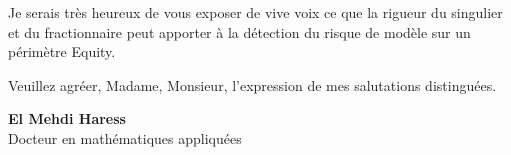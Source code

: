 \documentclass[10pt,a4paper]{article}
\begin{document}
Je serais très heureux de vous exposer de vive voix ce que la rigueur du singulier et du fractionnaire peut
apporter à la détection du risque de modèle sur un périmètre Equity.

Veuillez agréer, Madame, Monsieur, l'expression de mes salutations distinguées.

\vspace{2.6ex}

\hfill
\begin{minipage}{0.42\textwidth}
\raggedleft
{\headingfont\bfseries\small El Mehdi Haress}\\[0.2ex]
{\small\color{muted}Docteur en mathématiques appliquées}
\end{minipage}
\end{document}
